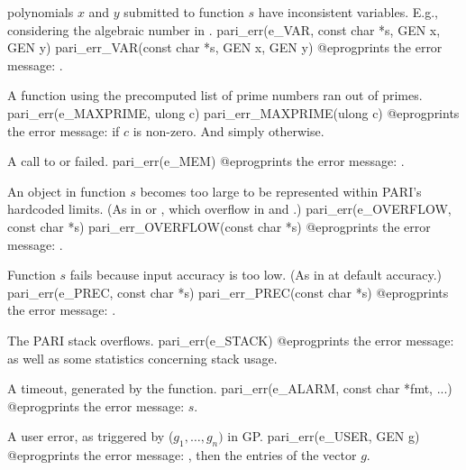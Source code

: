  polynomials $x$ and $y$ submitted to function $s$ have
inconsistent variables. E.g., considering the algebraic number
 in .
\bprog
  pari_err(e_VAR, const char *s, GEN x, GEN y)
  pari_err_VAR(const char *s, GEN x, GEN y)
@eprog\noindent prints the error message: .


 A function using the precomputed list of prime numbers
ran out of primes.
\bprog
  pari_err(e_MAXPRIME, ulong c)
  pari_err_MAXPRIME(ulong c)
@eprog\noindent prints the error message:  if $c$ is non-zero. And simply  otherwise.

 A call to  or  failed.
\bprog
  pari_err(e_MEM)
@eprog\noindent prints the error message: .

 An object in function $s$ becomes too large to be
represented within PARI's hardcoded limits. (As in 
or , which overflow in  and .)
\bprog
  pari_err(e_OVERFLOW, const char *s)
  pari_err_OVERFLOW(const char *s)
@eprog\noindent prints the error message: .

 Function $s$ fails because input accuracy is too low.
(As in  at default accuracy.)
\bprog
  pari_err(e_PREC, const char *s)
  pari_err_PREC(const char *s)
@eprog\noindent prints the error message: .

 The PARI stack overflows.
\bprog
  pari_err(e_STACK)
@eprog\noindent prints the error message: 
as well as some statistics concerning stack usage.


 A timeout, generated by the  function.
\bprog
  pari_err(e_ALARM, const char *fmt, ...)
@eprog\noindent prints the error message: $s$.

 A user error, as triggered by ($g_1,\dots,g_n)$
in GP.
\bprog
  pari_err(e_USER, GEN g)
@eprog\noindent prints the error message: , then the
entries of the vector $g$.



